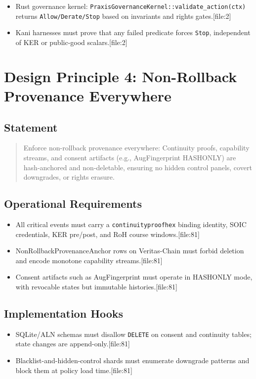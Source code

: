 \documentclass[11pt]{article}
\begin{document}
\begin{itemize}[nosep]
  \item Rust governance kernel: \texttt{PraxisGovernanceKernel::validate\_action(ctx)} returns \texttt{Allow/Derate/Stop} based on invariants and rights gates.[file:2]
  \item Kani harnesses must prove that any failed predicate forces \texttt{Stop}, independent of KER or public-good scalars.[file:2]
\end{itemize}

\section{Design Principle 4: Non-Rollback Provenance Everywhere}

\subsection{Statement}

\begin{quote}
Enforce non-rollback provenance everywhere: Continuity proofs, capability streams, and consent artifacts (e.g., AugFingerprint HASHONLY) are hash-anchored and non-deletable, ensuring no hidden control panels, covert downgrades, or rights erasure.
\end{quote}

\subsection{Operational Requirements}

\begin{itemize}[nosep]
  \item All critical events must carry a \texttt{continuityproofhex} binding identity, SOIC credentials, KER pre/post, and RoH course windows.[file:81]
  \item NonRollbackProvenanceAnchor rows on Veritas-Chain must forbid deletion and encode monotone capability streams.[file:81]
  \item Consent artifacts such as AugFingerprint must operate in HASHONLY mode, with revocable states but immutable histories.[file:81]
\end{itemize}

\subsection{Implementation Hooks}

\begin{itemize}[nosep]
  \item SQLite/ALN schemas must disallow \texttt{DELETE} on consent and continuity tables; state changes are append-only.[file:81]
  \item Blacklist-and-hidden-control shards must enumerate downgrade patterns and block them at policy load time.[file:81]
\end{itemize}
\end{document}
